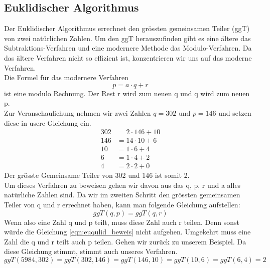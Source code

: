 \subsection{Euklidischer Algorithmus}
Der Euklidischer Algorithmus errechnet den grössten gemeinsamen Teiler (ggT) von zwei natürlichen Zahlen. Um den ggT herauszufinden gibt es eine ältere das Subtraktions-Verfahren und eine modernere Methode das Modulo-Verfahren. Da das ältere Verfahren nicht so effizient ist, konzentrieren wir uns auf das moderne Verfahren.\\
Die Formel für das modernere Verfahren 
%
\begin{equation}
  \label{eqn:euklidischer_algo}
  p = a \cdot q + r
\end{equation}
%
ist eine modulo Rechnung. Der Rest r wird zum neuen q und q wird zum neuen p. \\
Zur Veranschaulichung nehmen wir zwei Zahlen $q = 302$ und $p = 146$ und setzen diese in usere Gleichung ein.
%
\begin{equation}
  \begin{split}
    302 & = 2 \cdot 146 + 10 \\
    146 & = 14 \cdot 10 + 6  \\
    10 & = 1 \cdot 6 + 4  \\
    6 & = 1 \cdot 4 + 2  \\
    4 & = 2 \cdot 2 + 0
    \label{eqn:euqulid_beweis}
  \end{split}
\end{equation}
%
Der grösste Gemeinsame Teiler von 302 und 146 ist somit 2. \\[2ex]
Um dieses Verfahren zu beweisen gehen wir davon aus das q, p, r und a alles natürliche Zahlen sind. Da wir im zweiten Schritt den grössten gemeinsamen Teiler von q und r errechnet haben, kann man folgende Gleichung aufstellen:
%
\begin{equation}
  ggT(q,p) = ggT(q,r)
\end{equation}
%
Wenn also eine Zahl q und p teilt, muss diese Zahl auch r teilen. Denn sonst würde die Gleichung \ref{eqn:euqulid_beweis} nicht aufgehen. Umgekehrt muss eine Zahl die q und r teilt auch p teilen. Gehen wir zurück zu unserem Beispiel. Da diese Gleichung stimmt, stimmt auch unseres Verfahren.
%
\begin{equation*}
 ggT(5984,302) = ggT(302,146) = ggT(146,10) = ggT(10,6) = ggT(6,4) = 2 
\end{equation*}
%
